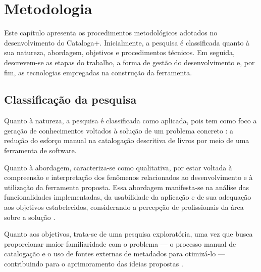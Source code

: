 %

\chapter{Metodologia}
\label{cap:metodologia}

Este capítulo apresenta os procedimentos metodológicos adotados no desenvolvimento do Cataloga+. Inicialmente, a pesquisa é classificada quanto à sua natureza, abordagem, objetivos e procedimentos técnicos. Em seguida, descrevem-se as etapas do trabalho, a forma de gestão do desenvolvimento e, por fim, as tecnologias empregadas na construção da ferramenta.

\section{Classificação da pesquisa}
\label{sec:classificacao}

Quanto à natureza, a pesquisa é classificada como aplicada, pois tem como foco a geração de conhecimentos voltados à solução de um problema concreto \cite{gil2008}: a redução do esforço manual na catalogação descritiva de livros por meio de uma ferramenta de software.

Quanto à abordagem, caracteriza-se como qualitativa, por estar voltada à compreensão e interpretação dos fenômenos relacionados ao desenvolvimento e à utilização da ferramenta proposta. Essa abordagem manifesta-se na análise das funcionalidades implementadas, da usabilidade da aplicação e de sua adequação aos objetivos estabelecidos, considerando a percepção de profissionais da área sobre a solução \cite{gil2008,creswell2014}.

Quanto aos objetivos, trata-se de uma pesquisa exploratória, uma vez que busca proporcionar maior familiaridade com o problema --- o processo manual de catalogação e o uso de fontes externas de metadados para otimizá-lo --- contribuindo para o aprimoramento das ideias propostas \cite{gil2008,prodanov2013}.

